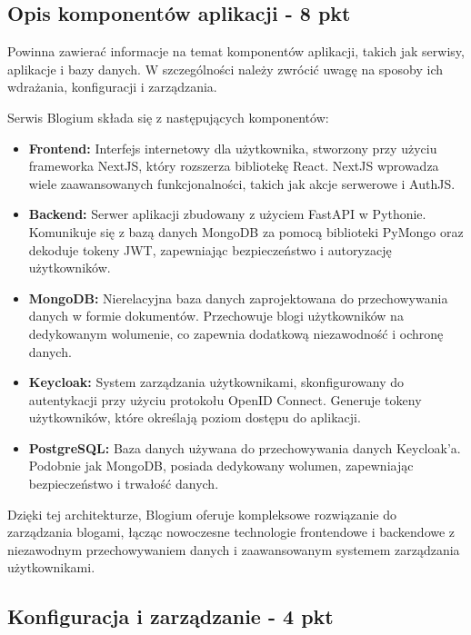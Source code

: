 \documentclass[12pt,a4paper]{article}
\begin{document}
\subsection{Opis komponentów aplikacji - 8 pkt}
\label{sec:FunctionalConditions}

Powinna zawierać informacje na temat komponentów aplikacji, takich jak serwisy, aplikacje i bazy danych. W szczególności należy zwrócić uwagę na sposoby ich wdrażania, konfiguracji i zarządzania.

Serwis Blogium składa się z następujących komponentów:

\begin{itemize}
  \item \textbf{Frontend:} Interfejs internetowy dla użytkownika, stworzony przy użyciu frameworka NextJS, który rozszerza bibliotekę React. NextJS wprowadza wiele zaawansowanych funkcjonalności, takich jak akcje serwerowe i AuthJS.
  
  \item \textbf{Backend:} Serwer aplikacji zbudowany z użyciem FastAPI w Pythonie. Komunikuje się z bazą danych MongoDB za pomocą biblioteki PyMongo oraz dekoduje tokeny JWT, zapewniając bezpieczeństwo i autoryzację użytkowników.
  
  \item \textbf{MongoDB:} Nierelacyjna baza danych zaprojektowana do przechowywania danych w formie dokumentów. Przechowuje blogi użytkowników na dedykowanym wolumenie, co zapewnia dodatkową niezawodność i ochronę danych.
  
  \item \textbf{Keycloak:} System zarządzania użytkownikami, skonfigurowany do autentykacji przy użyciu protokołu OpenID Connect. Generuje tokeny użytkowników, które określają poziom dostępu do aplikacji.
  
  \item \textbf{PostgreSQL:} Baza danych używana do przechowywania danych Keycloak'a. Podobnie jak MongoDB, posiada dedykowany wolumen, zapewniając bezpieczeństwo i trwałość danych.
\end{itemize}

Dzięki tej architekturze, Blogium oferuje kompleksowe rozwiązanie do zarządzania blogami, łącząc nowoczesne technologie frontendowe i backendowe z niezawodnym przechowywaniem danych i zaawansowanym systemem zarządzania użytkownikami.
\subsection{Konfiguracja i zarządzanie - 4 pkt}
\label{sec:NonFunctionalConditions}
\end{document}
